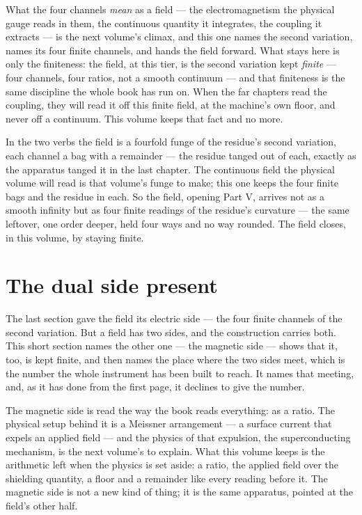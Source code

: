 What the four channels \emph{mean} as a field --- the electromagnetism the physical gauge reads in them, the continuous
quantity it integrates, the coupling it extracts --- is the next volume's climax, and this one names the second
variation, names its four finite channels, and hands the field forward. What stays here is only the finiteness: the
field, at this tier, is the second variation kept \emph{finite} --- four channels, four ratios, not a smooth continuum
--- and that finiteness is the same discipline the whole book has run on. When the far chapters read the coupling, they
will read it off this finite field, at the machine's own floor, and never off a continuum. This volume keeps that fact
and no more.

In the two verbs the field is a fourfold funge of the residue's second variation, each channel a bag with a remainder
--- the residue tanged out of each, exactly as the apparatus tanged it in the last chapter. The continuous field the
physical volume will read is that volume's funge to make; this one keeps the four finite bags and the residue in each.
So the field, opening Part V, arrives not as a smooth infinity but as four finite readings of the residue's curvature
--- the same leftover, one order deeper, held four ways and no way rounded. The field closes, in this volume, by
staying finite.

\section{The dual side present}

The last section gave the field its electric side --- the four finite channels of the second variation. But a field has
two sides, and the construction carries both. This short section names the other one --- the magnetic side --- shows
that it, too, is kept finite, and then names the place where the two sides meet, which is the number the whole
instrument has been built to reach. It names that meeting, and, as it has done from the first page, it declines to give
the number.

The magnetic side is read the way the book reads everything: as a ratio. The physical setup behind it is a Meissner
arrangement --- a surface current that expels an applied field --- and the physics of that expulsion, the
superconducting mechanism, is the next volume's to explain. What this volume keeps is the arithmetic left when the
physics is set aside: a ratio, the applied field over the shielding quantity, a floor and a remainder like every
reading before it. The magnetic side is not a new kind of thing; it is the same apparatus, pointed at the field's other
half.

